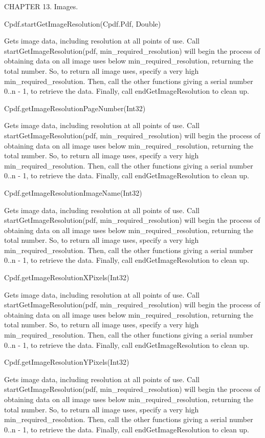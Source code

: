 CHAPTER 13. Images.

Cpdf.startGetImageResolution(Cpdf.Pdf, Double)

Gets image data, including resolution at all points of use. Call
startGetImageResolution(pdf, min_required_resolution) will begin the
process of obtaining data on all image uses below min_required_resolution, 
returning the total number. So, to return all image uses, specify a very
high min_required_resolution. Then, call the other functions giving a
serial number 0..n - 1, to retrieve the data. Finally, call
endGetImageResolution to clean up.

Cpdf.getImageResolutionPageNumber(Int32)

Gets image data, including resolution at all points of use. Call
startGetImageResolution(pdf, min_required_resolution) will begin the
process of obtaining data on all image uses below min_required_resolution, 
returning the total number. So, to return all image uses, specify a very
high min_required_resolution. Then, call the other functions giving a
serial number 0..n - 1, to retrieve the data. Finally, call
endGetImageResolution to clean up.

Cpdf.getImageResolutionImageName(Int32)

Gets image data, including resolution at all points of use. Call
startGetImageResolution(pdf, min_required_resolution) will begin the
process of obtaining data on all image uses below min_required_resolution, 
returning the total number. So, to return all image uses, specify a very
high min_required_resolution. Then, call the other functions giving a
serial number 0..n - 1, to retrieve the data. Finally, call
endGetImageResolution to clean up.

Cpdf.getImageResolutionXPixels(Int32)

Gets image data, including resolution at all points of use. Call
startGetImageResolution(pdf, min_required_resolution) will begin the
process of obtaining data on all image uses below min_required_resolution, 
returning the total number. So, to return all image uses, specify a very
high min_required_resolution. Then, call the other functions giving a
serial number 0..n - 1, to retrieve the data. Finally, call
endGetImageResolution to clean up.

Cpdf.getImageResolutionYPixels(Int32)

Gets image data, including resolution at all points of use. Call
startGetImageResolution(pdf, min_required_resolution) will begin the
process of obtaining data on all image uses below min_required_resolution, 
returning the total number. So, to return all image uses, specify a very
high min_required_resolution. Then, call the other functions giving a
serial number 0..n - 1, to retrieve the data. Finally, call
endGetImageResolution to clean up.

